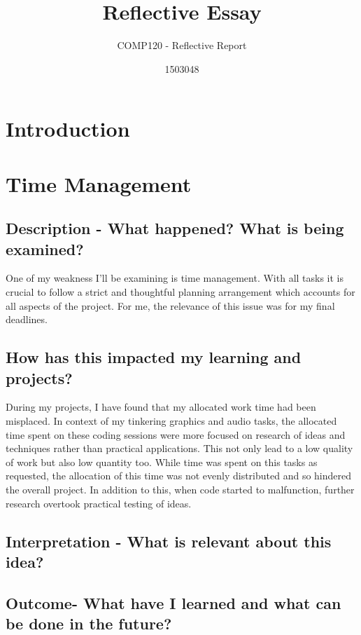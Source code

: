\documentclass{scrartcl}
\title{Reflective Essay}
\subtitle{COMP120 - Reflective Report}
\author{1503048}
\begin{document}
\maketitle


\section{Introduction}


\section{Time Management}

\subsection{Description - What happened? What is being examined?}

One of my weakness I'll be examining is time management. With all tasks it is crucial to follow a strict and thoughtful planning arrangement which accounts for all aspects of the project. For me, the relevance of this issue was for my final deadlines.

\subsection{How has this impacted my learning and projects?}

During my projects, I have found that my allocated work time had been misplaced. In context of my tinkering graphics and audio tasks, the allocated time spent on these coding sessions were more focused on research of ideas and techniques rather than practical applications. This not only lead to a low quality of work but also low quantity too. While time was spent on this tasks as requested, the allocation of this time was not evenly distributed and so hindered the overall project. In addition to this, when code started to malfunction, further research overtook practical testing of ideas.


\subsection{Interpretation - What is relevant about this idea?}

\subsection{Outcome- What have I learned and what can be done in the future?}
\end{document}
